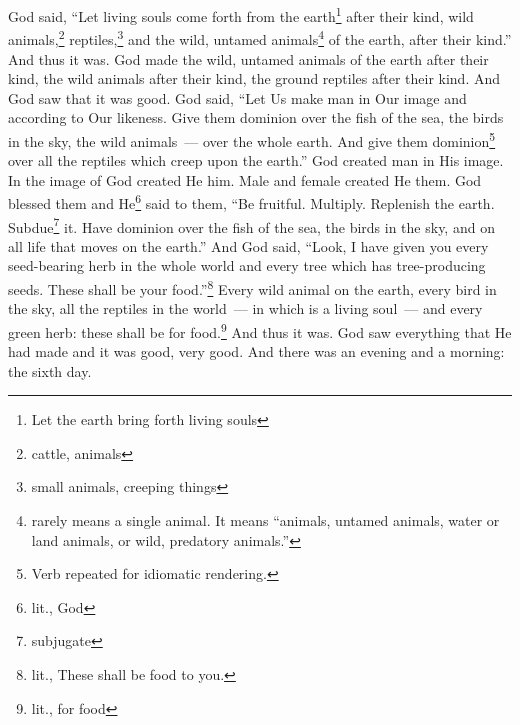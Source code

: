 \begin{inparaenum}
     God said, ``Let living souls come forth from the earth\footnote{Let the earth bring forth living souls} after their kind, wild animals,\footnote{cattle, animals} reptiles,\footnote{small animals, creeping things} and the wild, untamed animals\footnote{ rarely means a single animal. It means ``animals, untamed animals, water or land animals, or wild, predatory animals.''} of the earth, after their kind.'' And thus it was.%
     God made the wild, untamed animals of the earth after their kind, the wild animals after their kind, the ground reptiles after their kind. And God saw that it was good.%
     God said, ``Let Us make man in Our image and according to Our likeness. Give them dominion over the fish of the sea, the birds in the sky, the wild animals~--- over the whole earth. And give them dominion\footnote{Verb repeated for idiomatic rendering.} over all the reptiles which creep upon the earth.''%
     God created man in His image. In the image of God created He him. Male and female created He them.%
     God blessed them and He\footnote{lit., God} said to them, ``Be fruitful. Multiply. Replenish the earth. Subdue\footnote{subjugate} it. Have dominion over the fish of the sea, the birds in the sky, and on all life that moves on the earth.''%
     And God said, ``Look, I have given you every seed-bearing herb in the whole world and every tree which has tree-producing seeds. These shall be your food.''\footnote{lit., These shall be food to you.}%
     Every wild animal on the earth, every bird in the sky, all the reptiles in the world~--- in which is a living soul~--- and every green herb: these shall be for food.\footnote{lit., for food} And thus it was.%
     God saw everything that He had made and it was good, very good. And there was an evening and a morning: the sixth day.%
\end{inparaenum}
